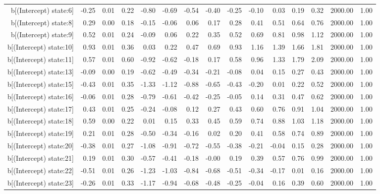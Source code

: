 \begin{table}[ht]
\begin{tabular}{rrrrrrrrrrrrrrr}
  b[(Intercept) state:6] & -0.25 & 0.01 & 0.22 & -0.80 & -0.69 & -0.54 & -0.40 & -0.25 & -0.10 & 0.03 & 0.19 & 0.32 & 2000.00 & 1.00 \\ 
  b[(Intercept) state:8] & 0.29 & 0.00 & 0.18 & -0.15 & -0.06 & 0.06 & 0.17 & 0.28 & 0.41 & 0.51 & 0.64 & 0.76 & 2000.00 & 1.00 \\ 
  b[(Intercept) state:9] & 0.52 & 0.01 & 0.24 & -0.09 & 0.06 & 0.22 & 0.35 & 0.52 & 0.69 & 0.81 & 0.98 & 1.12 & 2000.00 & 1.00 \\ 
  b[(Intercept) state:10] & 0.93 & 0.01 & 0.36 & 0.03 & 0.22 & 0.47 & 0.69 & 0.93 & 1.16 & 1.39 & 1.66 & 1.81 & 2000.00 & 1.00 \\ 
  b[(Intercept) state:11] & 0.57 & 0.01 & 0.60 & -0.92 & -0.62 & -0.18 & 0.17 & 0.58 & 0.96 & 1.33 & 1.79 & 2.09 & 2000.00 & 1.00 \\ 
  b[(Intercept) state:13] & -0.09 & 0.00 & 0.19 & -0.62 & -0.49 & -0.34 & -0.21 & -0.08 & 0.04 & 0.15 & 0.27 & 0.43 & 2000.00 & 1.00 \\ 
  b[(Intercept) state:15] & -0.43 & 0.01 & 0.35 & -1.33 & -1.12 & -0.88 & -0.65 & -0.43 & -0.20 & 0.01 & 0.22 & 0.52 & 2000.00 & 1.00 \\ 
  b[(Intercept) state:16] & -0.06 & 0.01 & 0.28 & -0.79 & -0.61 & -0.42 & -0.25 & -0.05 & 0.14 & 0.31 & 0.47 & 0.62 & 2000.00 & 1.00 \\ 
  b[(Intercept) state:17] & 0.43 & 0.01 & 0.25 & -0.24 & -0.08 & 0.12 & 0.27 & 0.43 & 0.60 & 0.76 & 0.91 & 1.04 & 2000.00 & 1.00 \\ 
  b[(Intercept) state:18] & 0.59 & 0.00 & 0.22 & 0.01 & 0.15 & 0.33 & 0.45 & 0.59 & 0.74 & 0.88 & 1.03 & 1.18 & 2000.00 & 1.00 \\ 
  b[(Intercept) state:19] & 0.21 & 0.01 & 0.28 & -0.50 & -0.34 & -0.16 & 0.02 & 0.20 & 0.41 & 0.58 & 0.74 & 0.89 & 2000.00 & 1.00 \\ 
  b[(Intercept) state:20] & -0.38 & 0.01 & 0.27 & -1.08 & -0.91 & -0.72 & -0.55 & -0.38 & -0.21 & -0.04 & 0.15 & 0.28 & 2000.00 & 1.00 \\ 
  b[(Intercept) state:21] & 0.19 & 0.01 & 0.30 & -0.57 & -0.41 & -0.18 & -0.00 & 0.19 & 0.39 & 0.57 & 0.76 & 0.99 & 2000.00 & 1.00 \\ 
  b[(Intercept) state:22] & -0.51 & 0.01 & 0.26 & -1.23 & -1.03 & -0.84 & -0.68 & -0.51 & -0.34 & -0.17 & 0.01 & 0.16 & 2000.00 & 1.00 \\ 
  b[(Intercept) state:23] & -0.26 & 0.01 & 0.33 & -1.17 & -0.94 & -0.68 & -0.48 & -0.25 & -0.04 & 0.16 & 0.39 & 0.60 & 2000.00 & 1.00 \\ 

\end{tabular}
\end{table}
